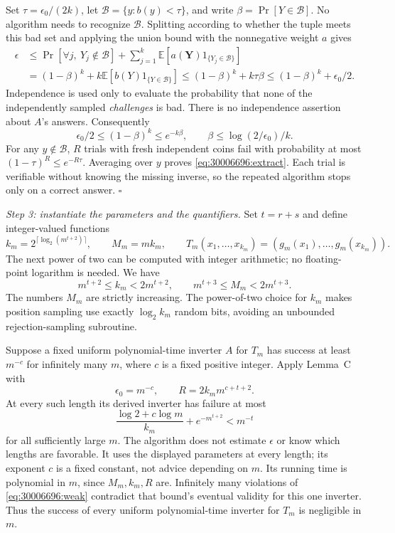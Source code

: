 \documentclass[11pt,a4paper]{article}
\newcommand{\E}{\mathbb{E}}
\numberwithin{equation}{section}
\begin{document}
Set $\tau=\epsilon_0/(2k)$, let
$\mathcal B=\{y:b(y)<\tau\}$, and write
$\beta=\Pr[Y\in\mathcal B]$. No algorithm needs to recognize
$\mathcal B$. Splitting according to whether the tuple meets this bad
set and applying the union bound with the nonnegative weight $a$ gives
\begin{align}
 \epsilon
 &\le \Pr[\forall j,\ Y_j\notin\mathcal B]
       +\sum_{j=1}^k \E[a(\mathbf Y)1_{\{Y_j\in\mathcal B\}}]
       \label{eq:30006696:bad1}\\
 &= (1-\beta)^k+k\E[b(Y)1_{\{Y\in\mathcal B\}}]
 \le (1-\beta)^k+k\tau\beta
 \le (1-\beta)^k+\epsilon_0/2. \label{eq:30006696:bad2}
\end{align}
Independence is used only to evaluate the probability
that none of the independently sampled \emph{challenges} is bad.
There is no independence assertion about $A$'s answers.
Consequently
\[
 \epsilon_0/2\le(1-\beta)^k\le e^{-k\beta},
 \qquad \beta\le\log(2/\epsilon_0)/k.
\]
For any $y\notin\mathcal B$, $R$ trials with fresh independent coins
fail with probability at most
$(1-\tau)^R\le e^{-R\tau}$. Averaging over $y$ proves
\eqref{eq:30006696:extract}. Each trial is verifiable without knowing the
missing inverse, so the repeated algorithm stops only on a correct
answer. \hfill$\square$

\textit{Step 3: instantiate the parameters and the quantifiers.}
Set $t=r+s$ and define integer-valued functions
\begin{equation}\label{eq:30006696:lengths}
 k_m=2^{\lceil\log_2(m^{t+2})\rceil},\qquad
 M_m=m k_m,\qquad
 T_m(x_1,\ldots,x_{k_m})=(g_m(x_1),\ldots,g_m(x_{k_m})).
\end{equation}
The next power of two can be computed with integer arithmetic; no
floating-point logarithm is needed. We have
\[
 m^{t+2}\le k_m<2m^{t+2},\qquad
 m^{t+3}\le M_m<2m^{t+3}.
\]
The numbers $M_m$ are strictly increasing. The power-of-two choice for
$k_m$ makes position sampling use exactly $\log_2 k_m$ random bits,
avoiding an unbounded rejection-sampling subroutine.

Suppose a fixed uniform polynomial-time inverter $A$ for $T_m$ has
success at least $m^{-c}$ for infinitely many $m$, where $c$ is a fixed
positive integer. Apply Lemma~C with
\[
 \epsilon_0=m^{-c},\qquad R=2k_m m^{c+t+2}.
\]
At every such length its derived inverter has failure at most
\begin{equation}\label{eq:30006696:contradiction}
 \frac{\log 2+c\log m}{k_m}+e^{-m^{t+2}}
       < m^{-t}
\end{equation}
for all sufficiently large $m$. The algorithm does not estimate
$\epsilon$ or know which lengths are favorable. It uses the displayed
parameters at every length; its exponent $c$ is a fixed constant, not
advice depending on $m$. Its running time is polynomial in $m$, since
$M_m,k_m,R$ are. Infinitely many violations of \eqref{eq:30006696:weak}
contradict that bound's eventual validity for this one inverter.
Thus the success of every uniform polynomial-time inverter for $T_m$
is negligible in $m$.
\end{document}
